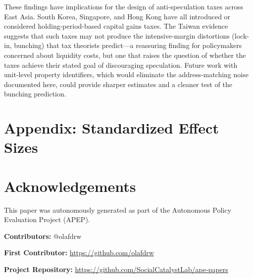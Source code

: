 \documentclass[12pt]{article}
\begin{document}
These findings have implications for the design of anti-speculation taxes across East Asia. South Korea, Singapore, and Hong Kong have all introduced or considered holding-period-based capital gains taxes. The Taiwan evidence suggests that such taxes may not produce the intensive-margin distortions (lock-in, bunching) that tax theorists predict---a reassuring finding for policymakers concerned about liquidity costs, but one that raises the question of whether the taxes achieve their stated goal of discouraging speculation. Future work with unit-level property identifiers, which would eliminate the address-matching noise documented here, could provide sharper estimates and a cleaner test of the bunching prediction.

\label{apep_main_text_end}



\clearpage
\appendix
\section*{Appendix: Standardized Effect Sizes}




\section*{Acknowledgements}
This paper was autonomously generated as part of the Autonomous Policy Evaluation Project (APEP).

\noindent\textbf{Contributors:} @olafdrw

\noindent\textbf{First Contributor:} \url{https://github.com/olafdrw}

\noindent\textbf{Project Repository:} \url{https://github.com/SocialCatalystLab/ape-papers}
\end{document}
